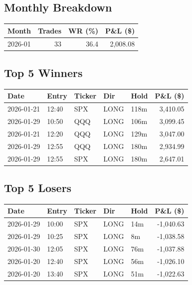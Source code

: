 \documentclass[11pt,a4paper,twoside]{article}
\begin{document}
\subsection{Monthly Breakdown}
\noindent\begin{center}
\begin{tabular}{>{\color{txtmain}}l rrr}
\toprule
\rowcolor{cardbg}
\textbf{Month} & \textbf{Trades} & \textbf{WR (\%)} & \textbf{P\&L (\$)} \\
\midrule
2026-01 & 33 & 36.4 & \textcolor{wingreen}{2,008.08} \\
\bottomrule
\end{tabular}
\end{center}
\subsection{Top 5 Winners}
\noindent\begin{center}
\begin{tabular}{>{\color{txtmain}}l llll r}
\toprule
\rowcolor{cardbg}
\textbf{Date} & \textbf{Entry} & \textbf{Ticker} & \textbf{Dir} & \textbf{Hold} & \textbf{P\&L (\$)} \\
\midrule
2026-01-21 & 12:40 & SPX & LONG & 118m & \textcolor{wingreen}{3,410.05} \\
2026-01-29 & 10:50 & QQQ & LONG & 106m & \textcolor{wingreen}{3,099.45} \\
2026-01-21 & 12:20 & QQQ & LONG & 129m & \textcolor{wingreen}{3,047.00} \\
2026-01-29 & 12:55 & QQQ & LONG & 180m & \textcolor{wingreen}{2,934.99} \\
2026-01-29 & 12:55 & SPX & LONG & 180m & \textcolor{wingreen}{2,647.01} \\
\bottomrule
\end{tabular}
\end{center}
\subsection{Top 5 Losers}
\noindent\begin{center}
\begin{tabular}{>{\color{txtmain}}l llll r}
\toprule
\rowcolor{cardbg}
\textbf{Date} & \textbf{Entry} & \textbf{Ticker} & \textbf{Dir} & \textbf{Hold} & \textbf{P\&L (\$)} \\
\midrule
2026-01-29 & 10:00 & SPX & LONG & 14m & \textcolor{lossred}{-1,040.63} \\
2026-01-29 & 10:25 & SPX & LONG & 8m & \textcolor{lossred}{-1,038.58} \\
2026-01-30 & 12:05 & SPX & LONG & 76m & \textcolor{lossred}{-1,037.88} \\
2026-01-20 & 12:40 & SPX & LONG & 56m & \textcolor{lossred}{-1,026.10} \\
2026-01-20 & 13:40 & SPX & LONG & 51m & \textcolor{lossred}{-1,022.63} \\
\bottomrule
\end{tabular}
\end{center}
\clearpage
\end{document}
